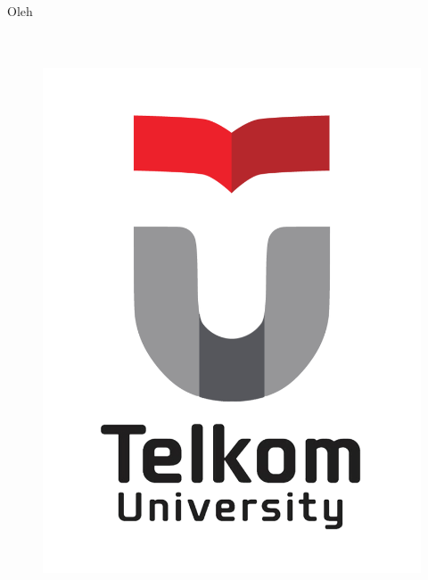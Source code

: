 \begin{titlepage}
\begin{center}
        \vspace*{1 cm}       
        Oleh\\
        \bo{\penulis} \\
        \bo{\nim} \\
        \vspace*{1.0cm}        
        \begin{figure}
            \begin{center}
                \includegraphics[scale=0.17]{pics/tel-u.png}
            \end{center}
        \end{figure}
        \vspace*{1.0cm}
    \end{center}
\end{titlepage}
